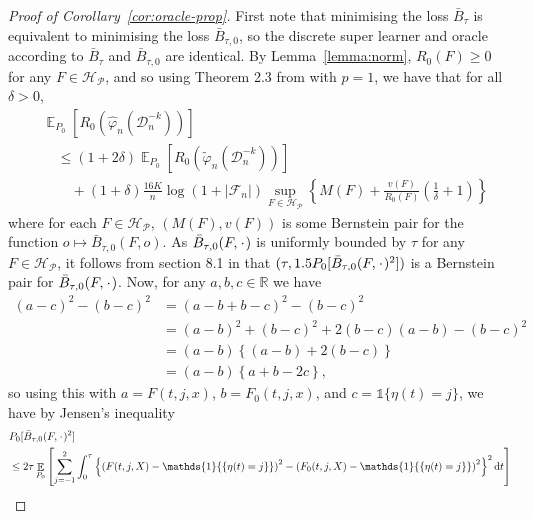 \documentclass[11pt]{article}
\theoremstyle{thmstyleone}%
\theoremstyle{thmstyletwo}%
\theoremstyle{thmstylethree}%
\DeclareMathOperator{\E}{\mathbb{E}} %
\newcommand{\R}{\mathbb{R}}
\newcommand{\blank}{\makebox[1ex]{\textbf{$\cdot$}}}
\renewcommand{\phi}{\varphi}
\newcommand*\diff{\mathop{}\!\mathrm{d}}
\newcommand{\1}{\mathds{1}}
\newcommand{\data}{\ensuremath{\mathcal{D}}}
\begin{document}
\begin{proof}[Proof of Corollary~\ref{cor:oracle-prop}]
  First note that minimising the loss \( \bar{B}_{\tau} \) is equivalent to
  minimising the loss \( \bar{B}_{\tau,0} \), so the discrete super learner and
  oracle according to \( \bar{B}_{\tau} \) and \( \bar{B}_{\tau,0} \) are
  identical. By Lemma~\ref{lemma:norm}, \( R_0(F) \geq 0 \) for any
  \( F \in \mathcal{H}_{\mathcal{P}} \), and so using Theorem 2.3 from
  \citep{vaart2006oracle} with \( p=1 \), we have that for all \( \delta >0 \),
\begin{align*}
  & \E_{P_0}{\left[ R_0(\hat{\phi}_n(\data_n^{-k})) \right]}
  \\
  &  \quad \leq
    (1+2\delta)\E_{P_0}{\left[ R_0(\tilde{\phi}_n(\data_n^{-k})) \right]}
  \\
  & \qquad + (1+\delta) \frac{16 K}{n}
    \log(1 + |\mathcal{F}_n|)\sup_{F \in \mathcal{H}_{\mathcal{P}}}
    \left\{
    M(F) + \frac{v(F)}{R_0(F)}
    \left(
    \frac{1}{\delta} + 1
    \right)
    \right\}
\end{align*}
where for each \( F \in \mathcal{H}_{\mathcal{P}} \), \( (M(F), v(F)) \) is some Bernstein pair for
the function \(o \mapsto \bar{B}_{\tau,0}(F, o) \). As
\( \bar{B}_{\tau,0}(F, \blank) \) is uniformly bounded by \( \tau \) for any
\( F \in \mathcal{H}_{\mathcal{P}} \), it follows from section 8.1 in \citep{vaart2006oracle} that
\( (\tau, 1.5 P_0{[\bar{B}_{\tau,0}(F, \blank)^2]}) \) is a Bernstein pair for
\( \bar{B}_{\tau,0}(F, \blank) \). Now, for any \( a,b,c \in \R \) we have
\begin{align*}
  (a-c)^2 - (b-c)^2
  & = (a-b+b-c)^2 - (b-c)^2
  \\
  & = (a-b)^2 + (b-c)^2 +2(b-c)(a-b) - (b-c)^2
  \\
  & = (a-b)
    \left\{
    (a-b) +  2(b-c)
    \right\}
  \\
  & = (a-b)
    \left\{
     a + b -2c
    \right\},
\end{align*}
so using this with \( a=F(t, j, x) \), \( b=F_0(t, j, x) \), and
\( c = \1{\{\eta(t) = j\}} \), we have by Jensen's inequality
\begin{align*}
  & P_0{[\bar{B}_{\tau,0}(F, \blank)^2]}
  \\
  & \leq
    2\tau\E_{P_0}{\left[
    \sum_{j=-1}^{2} \int_0^{\tau}
    \left\{
    \left(
    F(t, j, X) - \1{\{\eta(t) = j\}}
    \right)^2
    -
    \left(
    F_0(t, j, X) - \1{\{\eta(t) = j\}}
    \right)^2
    \right\}^2
    \diff t 
    \right]}
  \\

\end{align*}
\end{proof}
\end{document}
